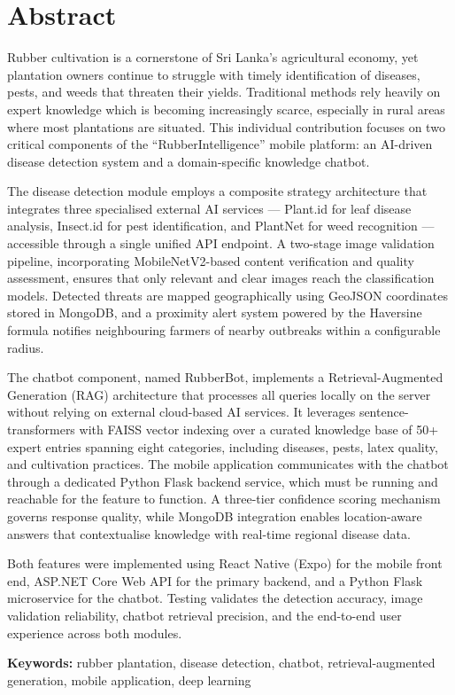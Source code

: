 \chapter*{Abstract}
\begin{singlespace}

Rubber cultivation is a cornerstone of Sri Lanka's agricultural economy, yet plantation owners continue to struggle with timely identification of diseases, pests, and weeds that threaten their yields. Traditional methods rely heavily on expert knowledge which is becoming increasingly scarce, especially in rural areas where most plantations are situated. This individual contribution focuses on two critical components of the ``RubberIntelligence'' mobile platform: an AI-driven disease detection system and a domain-specific knowledge chatbot.

The disease detection module employs a composite strategy architecture that integrates three specialised external AI services --- Plant.id for leaf disease analysis, Insect.id for pest identification, and PlantNet for weed recognition --- accessible through a single unified API endpoint. A two-stage image validation pipeline, incorporating MobileNetV2-based content verification and quality assessment, ensures that only relevant and clear images reach the classification models. Detected threats are mapped geographically using GeoJSON coordinates stored in MongoDB, and a proximity alert system powered by the Haversine formula notifies neighbouring farmers of nearby outbreaks within a configurable radius.

The chatbot component, named RubberBot, implements a Retrieval-Augmented Generation (RAG) architecture that processes all queries locally on the server without relying on external cloud-based AI services. It leverages sentence-transformers with FAISS vector indexing over a curated knowledge base of 50+ expert entries spanning eight categories, including diseases, pests, latex quality, and cultivation practices. The mobile application communicates with the chatbot through a dedicated Python Flask backend service, which must be running and reachable for the feature to function. A three-tier confidence scoring mechanism governs response quality, while MongoDB integration enables location-aware answers that contextualise knowledge with real-time regional disease data.

Both features were implemented using React Native (Expo) for the mobile front end, ASP.NET Core Web API for the primary backend, and a Python Flask microservice for the chatbot. Testing validates the detection accuracy, image validation reliability, chatbot retrieval precision, and the end-to-end user experience across both modules.

\vspace{0.5cm}
\textbf{Keywords:} rubber plantation, disease detection, chatbot, retrieval-augmented generation, mobile application, deep learning

\end{singlespace}
\newpage
